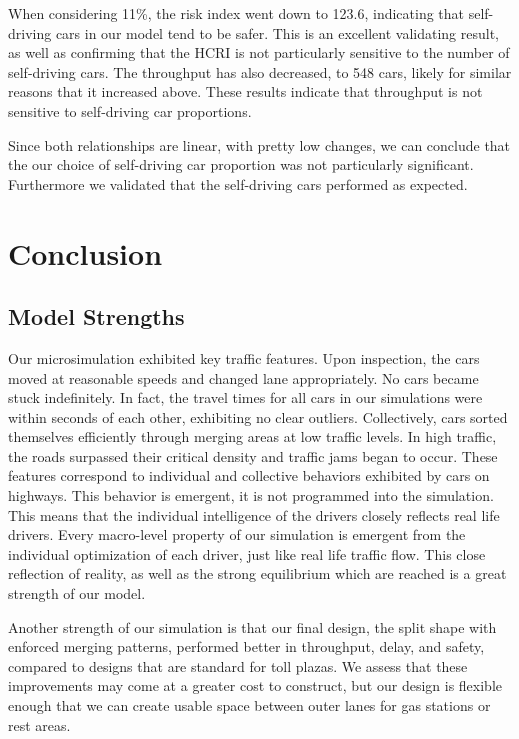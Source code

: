 \documentclass[a4paper, 11pt]{article}
\begin{document}
When considering 11\%, the risk index went down to 123.6, indicating that self-driving cars in our model tend to be safer. This is an excellent validating result, as well as confirming that the HCRI is not particularly sensitive to the number of self-driving cars. The throughput has also decreased, to 548 cars, likely for similar reasons that it increased above. %
These results indicate that throughput is not sensitive to self-driving car proportions.

Since both relationships are linear, with pretty low changes, we can conclude that the our choice of self-driving car proportion was not particularly significant. Furthermore we validated that the self-driving cars performed as expected.

\section{Conclusion}


\subsection{Model Strengths}
Our microsimulation exhibited key traffic features. Upon inspection, the cars moved at reasonable speeds and changed lane appropriately. No cars became stuck indefinitely. In fact, the travel times for all cars in our simulations were within seconds of each other, exhibiting no clear outliers. Collectively, cars sorted themselves efficiently through merging areas at low traffic levels. In high traffic, the roads surpassed their critical density and traffic jams began to occur. These features correspond to individual and collective behaviors exhibited by cars on highways. This behavior is emergent, it is not programmed into the simulation. This means that the individual intelligence of the drivers closely reflects real life drivers. Every macro-level property of our simulation is emergent from the individual optimization of each driver, just like real life traffic flow. This close reflection of reality, as well as the strong equilibrium which are reached is a great strength of our model. 

Another strength of our simulation is that our final design, the split shape with enforced merging patterns, performed better in throughput, delay, and safety, compared to designs that are standard for toll plazas. We assess that these improvements may come at a greater cost to construct, but our design is flexible enough that we can create usable space between outer lanes for gas stations or rest areas. 
\end{document}

